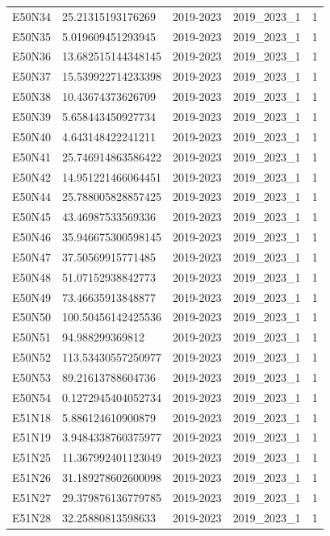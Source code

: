 \begin{landscape}
\begin{longtable}{lllll}
E50N34 & 25.21315193176269 & 2019-2023 & 2019\_2023\_1 & 1 \\
E50N35 & 5.019609451293945 & 2019-2023 & 2019\_2023\_1 & 1 \\
E50N36 & 13.682515144348145 & 2019-2023 & 2019\_2023\_1 & 1 \\
E50N37 & 15.539922714233398 & 2019-2023 & 2019\_2023\_1 & 1 \\
E50N38 & 10.43674373626709 & 2019-2023 & 2019\_2023\_1 & 1 \\
E50N39 & 5.658443450927734 & 2019-2023 & 2019\_2023\_1 & 1 \\
E50N40 & 4.643148422241211 & 2019-2023 & 2019\_2023\_1 & 1 \\
E50N41 & 25.746914863586422 & 2019-2023 & 2019\_2023\_1 & 1 \\
E50N42 & 14.951221466064451 & 2019-2023 & 2019\_2023\_1 & 1 \\
E50N44 & 25.788005828857425 & 2019-2023 & 2019\_2023\_1 & 1 \\
E50N45 & 43.46987533569336 & 2019-2023 & 2019\_2023\_1 & 1 \\
E50N46 & 35.946675300598145 & 2019-2023 & 2019\_2023\_1 & 1 \\
E50N47 & 37.50569915771485 & 2019-2023 & 2019\_2023\_1 & 1 \\
E50N48 & 51.07152938842773 & 2019-2023 & 2019\_2023\_1 & 1 \\
E50N49 & 73.46635913848877 & 2019-2023 & 2019\_2023\_1 & 1 \\
E50N50 & 100.50456142425536 & 2019-2023 & 2019\_2023\_1 & 1 \\
E50N51 & 94.988299369812 & 2019-2023 & 2019\_2023\_1 & 1 \\
E50N52 & 113.53430557250977 & 2019-2023 & 2019\_2023\_1 & 1 \\
E50N53 & 89.21613788604736 & 2019-2023 & 2019\_2023\_1 & 1 \\
E50N54 & 0.1272945404052734 & 2019-2023 & 2019\_2023\_1 & 1 \\
E51N18 & 5.886124610900879 & 2019-2023 & 2019\_2023\_1 & 1 \\
E51N19 & 3.9484338760375977 & 2019-2023 & 2019\_2023\_1 & 1 \\
E51N25 & 11.367992401123049 & 2019-2023 & 2019\_2023\_1 & 1 \\
E51N26 & 31.189278602600098 & 2019-2023 & 2019\_2023\_1 & 1 \\
E51N27 & 29.379876136779785 & 2019-2023 & 2019\_2023\_1 & 1 \\
E51N28 & 32.25880813598633 & 2019-2023 & 2019\_2023\_1 & 1 \\

\end{longtable}
\end{landscape}
